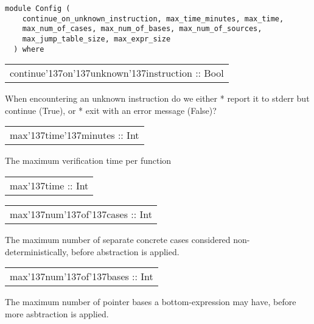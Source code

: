 \label{module:Config}
\haddockbeginheader
{\haddockverb\begin{verbatim}
module Config (
    continue_on_unknown_instruction, max_time_minutes, max_time,
    max_num_of_cases, max_num_of_bases, max_num_of_sources,
    max_jump_table_size, max_expr_size
  ) where\end{verbatim}}
\haddockendheader

\begin{haddockdesc}
\item[\begin{tabular}{@{}l}
continue{\char '137}on{\char '137}unknown{\char '137}instruction :: Bool
\end{tabular}]
{\haddockbegindoc
When encountering an unknown instruction do we either
   * report it to stderr but continue (True), or
   * exit with an error message (False)?\par}
\end{haddockdesc}
\begin{haddockdesc}
\item[\begin{tabular}{@{}l}
max{\char '137}time{\char '137}minutes :: Int
\end{tabular}]
{\haddockbegindoc
The maximum verification time per function\par}
\end{haddockdesc}
\begin{haddockdesc}
\item[\begin{tabular}{@{}l}
max{\char '137}time :: Int
\end{tabular}]
\end{haddockdesc}
\begin{haddockdesc}
\item[\begin{tabular}{@{}l}
max{\char '137}num{\char '137}of{\char '137}cases :: Int
\end{tabular}]
{\haddockbegindoc
The maximum number of separate concrete cases considered non-deterministically, before abstraction is applied.\par}
\end{haddockdesc}
\begin{haddockdesc}
\item[\begin{tabular}{@{}l}
max{\char '137}num{\char '137}of{\char '137}bases :: Int
\end{tabular}]
{\haddockbegindoc
The maximum number of pointer bases a bottom-expression may have, before more asbtraction is applied.\par}
\end{haddockdesc}
